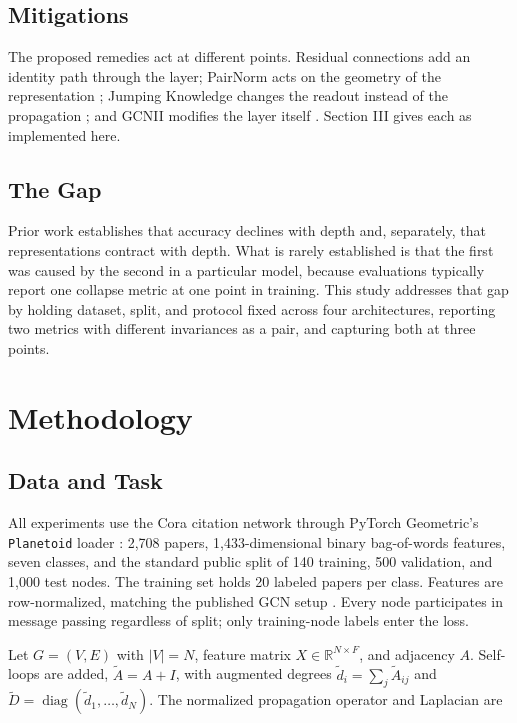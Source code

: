 \documentclass[
  conference]{IEEEtran}
\begin{document}
\subsection{Mitigations}\label{mitigations}

The proposed remedies act at different points. Residual connections add
an identity path through the layer; PairNorm acts on the geometry of the
representation \citep{zhao2020pairnorm}; Jumping Knowledge changes the
readout instead of the propagation \citep{xu2018representation}; and
GCNII modifies the layer itself \citep{chen2020simple}. Section III
gives each as implemented here.

\subsection{The Gap}\label{the-gap}

Prior work establishes that accuracy declines with depth and,
separately, that representations contract with depth. What is rarely
established is that the first was caused by the second in a particular
model, because evaluations typically report one collapse metric at one
point in training. This study addresses that gap by holding dataset,
split, and protocol fixed across four architectures, reporting two
metrics with different invariances as a pair, and capturing both at
three points.

\section{Methodology}\label{methodology}

\subsection{Data and Task}\label{data-and-task}

All experiments use the Cora citation network through PyTorch
Geometric's \texttt{Planetoid} loader
\citep{sen2008collective, yang2016revisiting}: 2,708 papers,
1,433-dimensional binary bag-of-words features, seven classes, and the
standard public split of 140 training, 500 validation, and 1,000 test
nodes. The training set holds 20 labeled papers per class. Features are
row-normalized, matching the published GCN setup \citep{kipf2017semi}.
Every node participates in message passing regardless of split; only
training-node labels enter the loss.

Let \(G=(V,E)\) with \(|V|=N\), feature matrix
\(X\in\mathbb{R}^{N\times F}\), and adjacency \(A\). Self-loops are
added, \(\widetilde{A}=A+I\), with augmented degrees
\(\widetilde{d}_i=\sum_j \widetilde{A}_{ij}\) and
\(\widetilde{D}=\operatorname{diag}(\widetilde{d}_1,\ldots,\widetilde{d}_N)\).
The normalized propagation operator and Laplacian are
\end{document}
